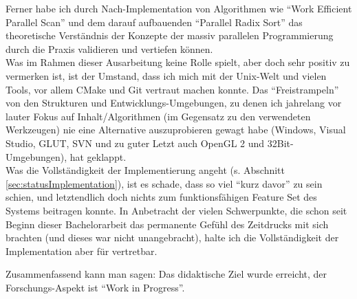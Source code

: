 Ferner habe ich durch Nach-Implementation von Algorithmen wie "`Work Efficient Parallel Scan"' und dem
darauf aufbauenden "`Parallel Radix Sort"' das theoretische Verständnis der Konzepte der 
massiv parallelen Programmierung durch die Praxis validieren und vertiefen können.\\

Was im Rahmen dieser Ausarbeitung keine Rolle spielt, aber doch sehr positiv zu vermerken ist,
ist der Umstand, dass ich mich mit der Unix-Welt und vielen Tools, vor allem CMake und Git vertraut
machen konnte. Das "`Freistrampeln"' von den Strukturen und Entwicklungs-Umgebungen,
zu denen ich jahrelang vor lauter Fokus auf Inhalt/Algorithmen (im Gegensatz zu den verwendeten Werkzeugen)
nie eine Alternative auszuprobieren gewagt habe (Windows, Visual Studio, GLUT, SVN und zu guter Letzt auch OpenGL 2 und 32Bit-Umgebungen), hat geklappt.\\

Was die Vollständigkeit der Implementierung angeht (s. Abschnitt \ref{sec:statusImplementation}), ist es schade,
dass so viel "`kurz davor"' zu sein schien, und letztendlich doch nichts zum funktionsfähigen Feature Set
des Systems beitragen konnte. In Anbetracht der vielen Schwerpunkte, die schon seit Beginn dieser Bachelorarbeit
das permanente Gefühl des Zeitdrucks mit sich brachten (und dieses war nicht unangebracht), halte ich die
Vollständigkeit der Implementation aber für vertretbar.

Zusammenfassend kann man sagen: Das didaktische Ziel wurde erreicht, der Forschungs-Aspekt ist "`Work in Progress"'.


\clearpage